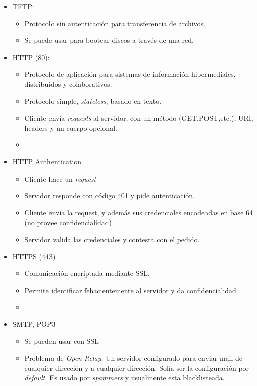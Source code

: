 \begin{itemize}
\begin{itemize}
	\end{itemize}
	\item TFTP:
	\begin{itemize}
		\item Protocolo sin autenticación para transferencia de archivos.
		\item Se puede usar para bootear discos a través de una red.
	\end{itemize}
	\item HTTP (80):
	\begin{itemize}
		\item Protocolo de aplicación para sistemas de información hipermediales, distribuidos y colaborativos.
		\item Protocolo simple, \textit{stateless}, basado en texto.
		\item Cliente envía \textit{requests} al servidor, con un método (GET,POST,etc.), URI, headers y un cuerpo opcional.
		\item 
	\end{itemize}
	\item HTTP Authentication
	\begin{itemize}
		\item Cliente hace un \textit{request}
		\item Servidor responde con código 401 y pide autenticación.
		\item Cliente envía la request, y además sus credenciales encodeadas en base 64 (no provee confidencialidad)
		\item Servidor valida las credenciales y contesta con el pedido.
	\end{itemize}
	\item HTTPS (443)
	\begin{itemize}
		\item Comunicación encriptada mediante SSL.
		\item Permite identificar fehacientemente al servidor y da confidencialidad.
		\item 
	\end{itemize}
	\item SMTP, POP3
	\begin{itemize}
		\item Se pueden usar con SSL
		\item Problema de \textit{Open Relay}: Un servidor configurado para enviar mail de cualquier dirección y a 
		cualquier dirección. Solía ser la configuración por \textit{default}. Es usado por \textit{spammers} y usualmente
		esta blacklisteada.
	\end{itemize}

\end{itemize}

